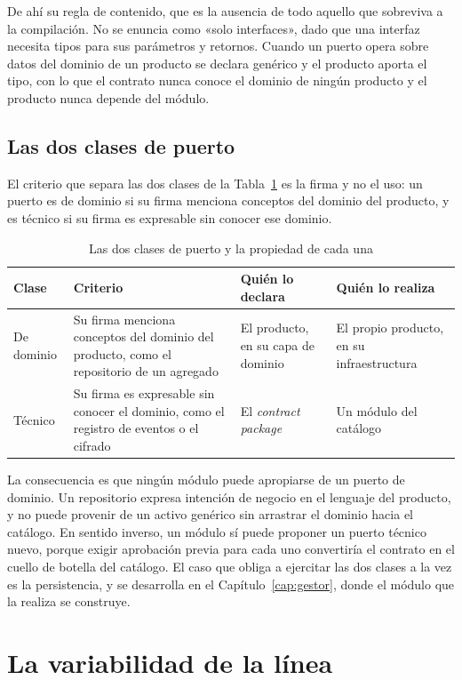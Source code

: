 De ahí su regla de contenido, que es la ausencia de todo aquello que
sobreviva a la compilación. No se enuncia como «solo interfaces», dado que
una interfaz necesita tipos para sus parámetros y retornos. Cuando un puerto
opera sobre datos del dominio de un producto se declara genérico y el
producto aporta el tipo, con lo que el contrato nunca conoce el dominio de
ningún producto y el producto nunca depende del módulo.

\subsection{Las dos clases de puerto}

El criterio que separa las dos clases de la Tabla~\ref{tab:puertos} es la
firma y no el uso: un puerto es de dominio si su firma menciona conceptos del
dominio del producto, y es técnico si su firma es expresable sin conocer ese
dominio.

\begin{table}[H]
\centering
{\footnotesize
\begin{tabular}{p{2.4cm}p{4.8cm}p{3.5cm}p{4.0cm}}
\toprule
\textbf{Clase} & \textbf{Criterio} & \textbf{Quién lo declara} & \textbf{Quién lo realiza} \\
\midrule
De dominio & Su firma menciona conceptos del dominio del producto, como el repositorio de un agregado & El producto, en su capa de dominio & El propio producto, en su infraestructura \\
Técnico & Su firma es expresable sin conocer el dominio, como el registro de eventos o el cifrado & El \emph{contract package} & Un módulo del catálogo \\
\bottomrule
\end{tabular}
}
\caption{Las dos clases de puerto y la propiedad de cada una}
\label{tab:puertos}
\end{table}

La consecuencia es que ningún módulo puede apropiarse de un puerto de
dominio. Un repositorio expresa intención de negocio en el lenguaje del
producto, y no puede provenir de un activo genérico sin arrastrar el dominio
hacia el catálogo. En sentido inverso, un módulo sí puede proponer un puerto
técnico nuevo, porque exigir aprobación previa para cada uno convertiría el
contrato en el cuello de botella del catálogo. El caso que obliga a ejercitar
las dos clases a la vez es la persistencia, y se desarrolla en el
Capítulo~\ref{cap:gestor}, donde el módulo que la realiza se construye.

\section{La variabilidad de la línea}
\label{sec:variabilidad}

